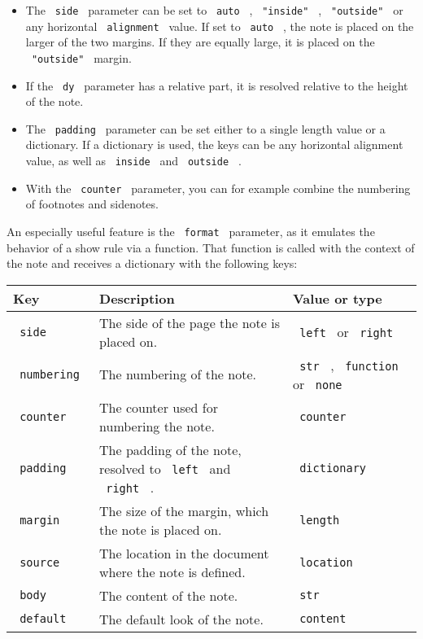 \begin{itemize}
\tightlist
\item
  The \texttt{\ side\ } parameter can be set to \texttt{\ auto\ } ,
  \texttt{\ "inside"\ } , \texttt{\ "outside"\ } or any horizontal
  \texttt{\ alignment\ } value. If set to \texttt{\ auto\ } , the note
  is placed on the larger of the two margins. If they are equally large,
  it is placed on the \texttt{\ "outside"\ } margin.
\item
  If the \texttt{\ dy\ } parameter has a relative part, it is resolved
  relative to the height of the note.
\item
  The \texttt{\ padding\ } parameter can be set either to a single
  length value or a dictionary. If a dictionary is used, the keys can be
  any horizontal alignment value, as well as \texttt{\ inside\ } and
  \texttt{\ outside\ } .
\item
  With the \texttt{\ counter\ } parameter, you can for example combine
  the numbering of footnotes and sidenotes.
\end{itemize}

An especially useful feature is the \texttt{\ format\ } parameter, as it
emulates the behavior of a show rule via a function. That function is
called with the context of the note and receives a dictionary with the
following keys:

\begin{longtable}[]{@{}lll@{}}
\toprule\noalign{}
Key & Description & Value or type \\
\midrule\noalign{}
\endhead
\bottomrule\noalign{}
\endlastfoot
\texttt{\ side\ } & The side of the page the note is placed on. &
\texttt{\ left\ } or \texttt{\ right\ } \\
\texttt{\ numbering\ } & The numbering of the note. & \texttt{\ str\ } ,
\texttt{\ function\ } or \texttt{\ none\ } \\
\texttt{\ counter\ } & The counter used for numbering the note. &
\texttt{\ counter\ } \\
\texttt{\ padding\ } & The padding of the note, resolved to
\texttt{\ left\ } and \texttt{\ right\ } . & \texttt{\ dictionary\ } \\
\texttt{\ margin\ } & The size of the margin, which the note is placed
on. & \texttt{\ length\ } \\
\texttt{\ source\ } & The location in the document where the note is
defined. & \texttt{\ location\ } \\
\texttt{\ body\ } & The content of the note. & \texttt{\ str\ } \\
\texttt{\ default\ } & The default look of the note. &
\texttt{\ content\ } \\
\end{longtable}

